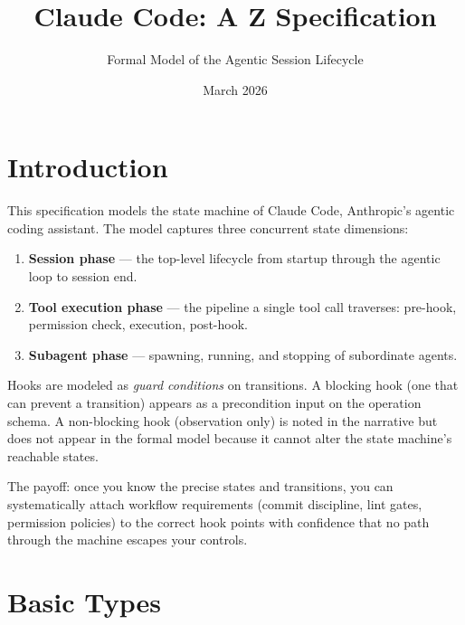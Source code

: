 \documentclass[a4paper,10pt,fleqn]{article}
\begin{document}
\title{Claude Code: A Z Specification}
\author{Formal Model of the Agentic Session Lifecycle}
\date{March 2026}
\maketitle

\tableofcontents
\newpage

\section{Introduction}

This specification models the state machine of Claude Code, Anthropic's
agentic coding assistant. The model captures three concurrent state
dimensions:

\begin{enumerate}
  \item \textbf{Session phase} --- the top-level lifecycle from startup
    through the agentic loop to session end.
  \item \textbf{Tool execution phase} --- the pipeline a single tool call
    traverses: pre-hook, permission check, execution, post-hook.
  \item \textbf{Subagent phase} --- spawning, running, and stopping of
    subordinate agents.
\end{enumerate}

Hooks are modeled as \emph{guard conditions} on transitions. A blocking
hook (one that can prevent a transition) appears as a precondition input
on the operation schema. A non-blocking hook (observation only) is noted
in the narrative but does not appear in the formal model because it
cannot alter the state machine's reachable states.

The payoff: once you know the precise states and transitions, you can
systematically attach workflow requirements (commit discipline, lint
gates, permission policies) to the correct hook points with confidence
that no path through the machine escapes your controls.

\section{Basic Types}
\end{document}
